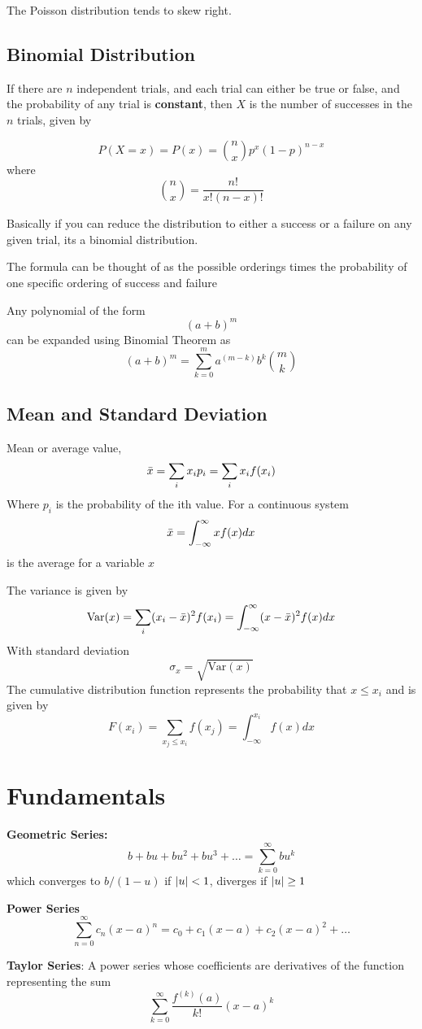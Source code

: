 \documentclass{article}
\begin{document}
The Poisson distribution tends to skew right.

\subsection{Binomial Distribution}
If there are $n$ independent trials, and each trial can either be true or false, and the probability of any trial is \textbf{constant}, then $X$ is the number of successes in the $n$ trials, given by

$$
P(X=x) = P(x) = \binom{n}{x} p^x (1-p)^{n-x}
$$
where 
$$
\binom{n}{x} = \frac{n!}{x!(n-x)!}
$$

Basically if you can reduce the distribution to either a success or a failure on any given trial, its a binomial distribution.

The formula can be thought of as the possible orderings times the probability of one specific ordering of success and failure

Any polynomial of the form $$ (a+b)^m $$ can be expanded using Binomial Theorem as 
$$
(a+b)^m = \sum_{k=0}^{m} a^{(m-k)} b^k \binom{m}{k}
$$

\subsection{Mean and Standard Deviation}
Mean or average value, 
$$
\Bar{x} = \sum_i  x_i p_i = \sum_i x_i f(x_i) 
$$
Where $p_i$ is the probability of the ith value.  For a continuous system
$$
\Bar{x} = \int_{-\infty}^{\infty} x f(x) dx
$$
is the average for a variable $x$

The variance is given by 
$$
\text{Var}(x) = \sum_{i}(x_i - \Bar{x})^2 f(x_i) = \int_{-\infty}^{\infty} (x-\Bar{x})^2 f(x) dx
$$
With standard deviation
$$
\sigma_x = \sqrt{\text{Var}(x)}
$$
The cumulative distribution function represents the probability that $x \leq x_i$ and is given by 
$$
F(x_i) = \sum_{x_j\leq x_i} f(x_{j}) = \int_{-\infty}^{x_i} f(x) dx
$$

\section{Fundamentals}
\textbf{Geometric Series:}
$$
b + bu + bu^2 + bu^3  + \dots = \sum_{k=0}^{\infty}bu^k
$$
which converges to $b/(1-u)$ if $\abs{u} < 1$, diverges if $\abs{u} \geq 1$

\textbf{Power Series}
$$
\sum_{n=0}^{\infty} c_n(x-a)^n = c_0 + c_1(x-a) + c_2(x-a)^2 + \dots
$$

\textbf{Taylor Series}:
A power series whose coefficients are derivatives of the function representing the sum
$$
\sum_{k=0}^{\infty} \frac{f^{(k)}(a)}{k!} (x-a)^{k}
$$
\end{document}
